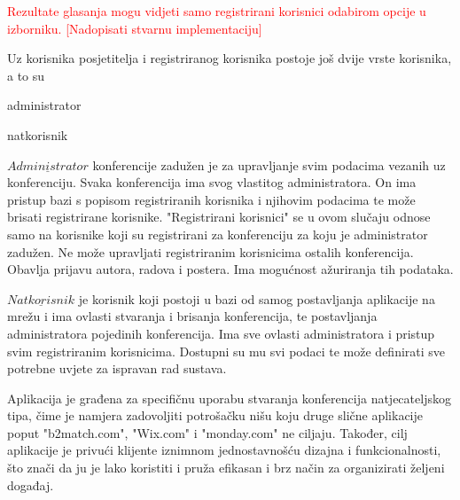 		\textcolor{red}{Rezultate glasanja mogu vidjeti samo registrirani korisnici odabirom opcije u izborniku. [Nadopisati stvarnu implementaciju]}
		
		Uz korisnika posjetitelja i registriranog korisnika postoje još dvije vrste korisnika, a to su
		\begin{packed_item}
			\item administrator
			\item natkorisnik
		\end{packed_item}
		
		$\underline{Administrator}$ konferencije zadužen je za upravljanje svim podacima vezanih uz konferenciju. Svaka konferencija ima svog vlastitog administratora. On ima pristup bazi s popisom registriranih korisnika i njihovim podacima te može brisati registrirane korisnike. "Registrirani korisnici" se u ovom slučaju odnose samo na korisnike koji su registrirani za konferenciju za koju je administrator zadužen. Ne može upravljati registriranim korisnicima ostalih konferencija. Obavlja prijavu autora, radova i postera. Ima mogućnost ažuriranja tih podataka.
		
		$\underline{Natkorisnik}$ je korisnik koji postoji u bazi od samog postavljanja aplikacije na mrežu i ima ovlasti stvaranja i brisanja konferencija, te postavljanja administratora pojedinih konferencija. Ima sve ovlasti administratora i pristup svim registriranim korisnicima.  Dostupni su mu svi podaci te može definirati sve potrebne uvjete za ispravan rad sustava.
		
		Aplikacija je građena za specifičnu uporabu stvaranja konferencija natjecateljskog tipa, čime je namjera zadovoljiti potrošačku nišu koju druge slične aplikacije poput "b2match.com", "Wix.com" i "monday.com" ne ciljaju. Također, cilj aplikacije je privući klijente iznimnom jednostavnošću dizajna i funkcionalnosti, što znači da ju je lako koristiti i pruža efikasan i brz način za organizirati željeni događaj.

